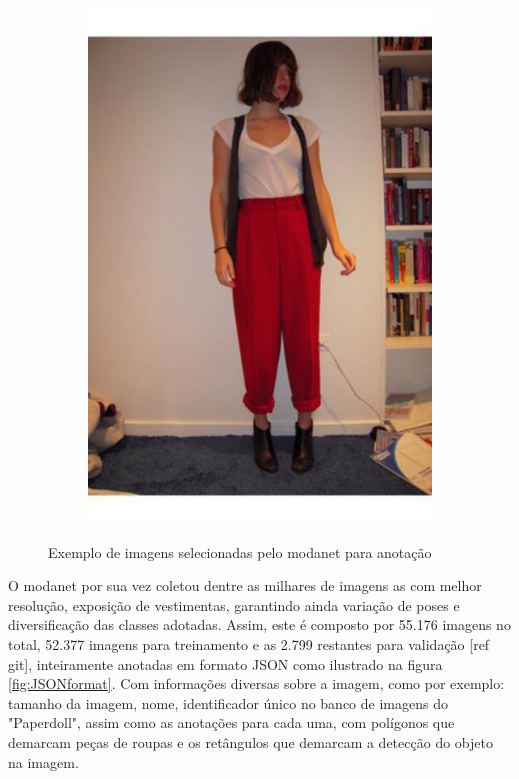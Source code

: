 \documentclass[12pt]{report}
\begin{document}
\begin{figure}
\begin{subfigure}[b]{0.2\textwidth}
    \includegraphics[scale=0.2]{images/paper4.jpg}
    \caption{}
    \label{fig:2}
  \end{subfigure}
  \caption{Exemplo de imagens selecionadas pelo modanet para anotação}
  \label{fig:paperdoll-modanet}
\end{figure}


O modanet por sua vez coletou dentre as milhares de imagens as com melhor resolução, exposição de vestimentas, garantindo ainda variação de poses e diversificação das classes adotadas. Assim, este é composto por 55.176 imagens no total, 52.377 imagens para treinamento e as 2.799 restantes para validação [ref git], inteiramente anotadas em formato JSON como ilustrado na figura \ref{fig:JSONformat}. Com informações diversas sobre a imagem, como por exemplo: tamanho da imagem, nome, identificador único no banco de imagens do "Paperdoll", assim como as anotações para cada uma, com polígonos que demarcam peças de roupas e os retângulos que demarcam a detecção do objeto na imagem.
\end{document}
